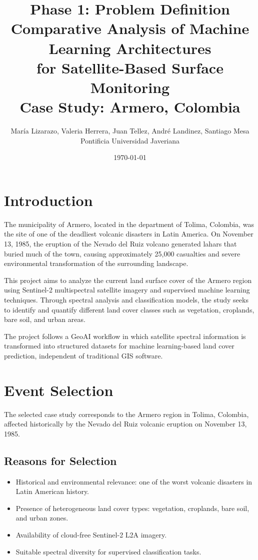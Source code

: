 \documentclass[12pt,a4paper]{article}
\title{
\textbf{Phase 1: Problem Definition} \\
Comparative Analysis of Machine Learning Architectures \\
for Satellite-Based Surface Monitoring \\
\vspace{0.5cm}
Case Study: Armero, Colombia
}
\author{
Mar\'ia Lizarazo, Valeria Herrera, Juan Tellez, Andr\'e Landinez, Santiago Mesa \\
Pontificia Universidad Javeriana
}
\date{\today}
\begin{document}
\maketitle
\tableofcontents
\newpage

\section{Introduction}

The municipality of Armero, located in the department of Tolima, Colombia, was the site of one of the deadliest volcanic disasters in Latin America. On November 13, 1985, the eruption of the Nevado del Ruiz volcano generated lahars that buried much of the town, causing approximately 25,000 casualties and severe environmental transformation of the surrounding landscape.

This project aims to analyze the current land surface cover of the Armero region using Sentinel-2 multispectral satellite imagery and supervised machine learning techniques. Through spectral analysis and classification models, the study seeks to identify and quantify different land cover classes such as vegetation, croplands, bare soil, and urban areas.

The project follows a GeoAI workflow in which satellite spectral information is transformed into structured datasets for machine learning-based land cover prediction, independent of traditional GIS software.

\section{Event Selection}

The selected case study corresponds to the Armero region in Tolima, Colombia, affected historically by the Nevado del Ruiz volcanic eruption on November 13, 1985.

\subsection{Reasons for Selection}

\begin{itemize}
    \item Historical and environmental relevance: one of the worst volcanic disasters in Latin American history.
    \item Presence of heterogeneous land cover types: vegetation, croplands, bare soil, and urban zones.
    \item Availability of cloud-free Sentinel-2 L2A imagery.
    \item Suitable spectral diversity for supervised classification tasks.
\end{itemize}
\end{document}
